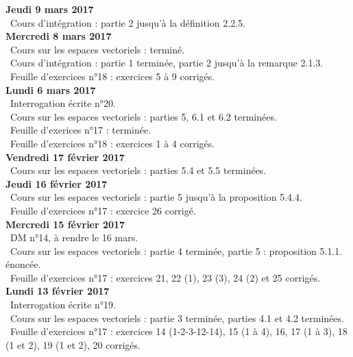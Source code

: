 \documentclass[12pt,a4paper]{article}
\begin{document}
\noindent\textbf{Jeudi 9 mars 2017}\\
\bu\ Cours d'intégration : partie 2 jusqu'à la définition 2.2.5.\vspace{.4cm}\\

\noindent\textbf{Mercredi 8 mars 2017}\\
\bu\ Cours sur les espaces vectoriels : terminé.\\
\bu\ Cours d'intégration : partie 1 terminée, partie 2 jusqu'à la remarque 2.1.3.\\
\bu\ Feuille d'exercices n°18 : exercices 5 à 9 corrigés.\vspace{.4cm}\\

\noindent\textbf{Lundi 6 mars 2017}\\
\bu\ Interrogation écrite n°20.\\
\bu\ Cours sur les espaces vectoriels :  parties 5, 6.1 et 6.2 terminées.\\
\bu\ Feuille d'exerices n°17 : terminée.\\
\bu\ Feuille d'exercices n°18 : exercices 1 à 4 corrigés.\vspace{.4cm}\\

\noindent\textbf{Vendredi 17 février 2017}\\
\bu\ Cours sur les espaces vectoriels :  parties 5.4 et 5.5 terminées.\vspace{.4cm}\\

\noindent\textbf{Jeudi 16 février 2017}\\
\bu\ Cours sur les espaces vectoriels :  partie 5 jusqu'à la proposition 5.4.4.\\
\bu\ Feuille d'exercices n°17 : exercice 26 corrigé.\vspace{.4cm}\\

\noindent\textbf{Mercredi 15 février 2017}\\
\bu\ DM n°14, à rendre le 16 mars.\\
\bu\ Cours sur les espaces vectoriels : partie 4 terminée, partie 5 : proposition 5.1.1. énoncée.\\
\bu\ Feuille d'exercices n°17 : exercices 21, 22 (1), 23 (3), 24 (2) et 25 corrigés.\vspace{.4cm}\\

\noindent\textbf{Lundi 13 février 2017}\\
\bu\ Interrogation écrite n°19.\\
\bu\ Cours sur les espaces vectoriels : partie 3 terminée, parties 4.1 et 4.2 terminées.\\
\bu\ Feuille d'exercices n°17 : exercices 14 (1-2-3-12-14), 15 (1 à 4), 16, 17 (1 à 3), 18 (1 et 2), 19 (1 et 2), 20 corrigés.\vspace{.4cm}\\
\end{document}
